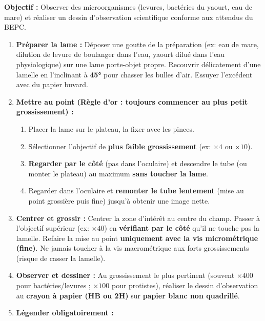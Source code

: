 \documentclass[11pt]{article}
\begin{document}
\begin{methode}
    \textbf{Objectif :} Observer des microorganismes (levures, bactéries du yaourt, eau de mare) et réaliser un dessin d'observation scientifique conforme aux attendus du BEPC.
    \begin{enumerate}
        \item \textbf{Préparer la lame :} Déposer une goutte de la préparation (ex: eau de mare, dilution de levure de boulanger dans l'eau, yaourt dilué dans l'eau physiologique) sur une lame porte-objet propre. Recouvrir délicatement d'une lamelle en l'inclinant à \textbf{45°} pour chasser les bulles d'air. Essuyer l'excédent avec du papier buvard.
        \item \textbf{Mettre au point (Règle d'or : toujours commencer au plus petit grossissement) :}
              \begin{enumerate}
                  \item Placer la lame sur le plateau, la fixer avec les pinces.
                  \item Sélectionner l'objectif de \textbf{plus faible grossissement} (ex: $\times 4$ ou $\times 10$).
                  \item \textbf{Regarder par le côté} (pas dans l'oculaire) et descendre le tube (ou monter le plateau) au maximum \textbf{sans toucher la lame}.
                  \item Regarder dans l'oculaire et \textbf{remonter le tube lentement} (mise au point grossière puis fine) jusqu'à obtenir une image nette.
              \end{enumerate}
        \item \textbf{Centrer et grossir :} Centrer la zone d'intérêt au centre du champ. Passer à l'objectif supérieur (ex: $\times 40$) en \textbf{vérifiant par le côté} qu'il ne touche pas la lamelle. Refaire la mise au point \textbf{uniquement avec la vis micrométrique (fine)}. Ne jamais toucher à la vis macrométrique aux forts grossissements (risque de casser la lamelle).
        \item \textbf{Observer et dessiner :} Au grossissement le plus pertinent (souvent $\times 400$ pour bactéries/levures ; $\times 100$ pour protistes), réaliser le dessin d'observation au \textbf{crayon à papier (HB ou 2H)} sur \textbf{papier blanc non quadrillé}.
        \item \textbf{Légender obligatoirement :}
              \begin{itemize}

\end{itemize}
\end{enumerate}
\end{methode}
\end{document}
